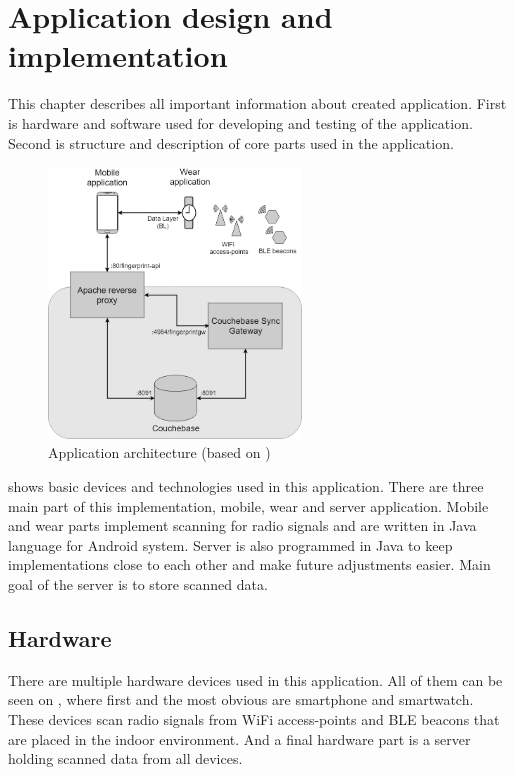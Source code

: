 \chapter{Application design and implementation}\label{sec:ApplicationDesingAndImplementation}
This chapter describes all important information about created application. First is hardware and software used for developing and testing of the application. Second is structure and description of core parts used in the application. 

\begin{figure}[H]
	\begin{centering}
		\includegraphics[width=0.6\textwidth]{img/server_architecture}
		\par\end{centering}
	\caption{Application architecture (based on \cite{IILUBLEB})}
	\label{fig01c05}
\end{figure}

 shows basic devices and technologies used in this application. There are three main part of this implementation, mobile, wear and server application. Mobile and wear parts implement scanning for radio signals and are written in Java language for Android system. Server is also programmed in Java to keep implementations close to each other and make future adjustments easier. Main goal of the server is to store scanned data.

\section{Hardware}\label{sec:Hardware}
There are multiple hardware devices used in this application. All of them can be seen on , where first and the most obvious are smartphone and smartwatch. These devices scan radio signals from WiFi access-points and BLE beacons that are placed in the indoor environment. And a final hardware part is a server holding scanned data from all devices.

